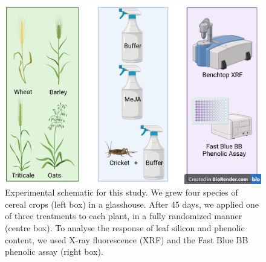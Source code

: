 \documentclass[12pt, letterpaper]{report}
\begin{document}
\begin{figure}[ht]
        \includegraphics[width = \textwidth]{images/Induction_schematic.png}
        \centering
        \caption{Experimental schematic for this study. We grew four species of cereal crops (left box) in a glasshouse. After 45 days, we applied one of three treatments to each plant, in a fully randomized manner (centre box). To analyse the response of leaf silicon and phenolic content, we used X-ray fluorescence (XRF) and the Fast Blue BB phenolic assay (right box).}
        \label{Fig:exp_design}
\end{figure}
\end{document}
